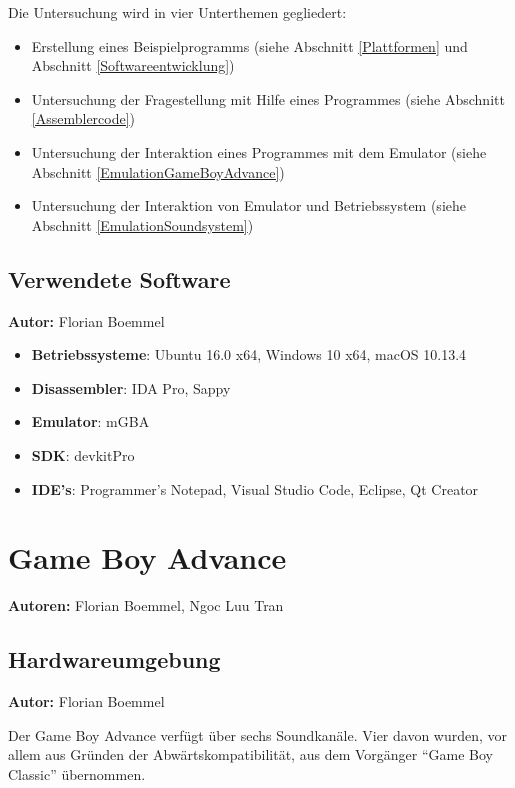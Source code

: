\documentclass[11pt,a4paper]{scrartcl}
\newcommand{\AutorFlorian} {
    \vspace{-4mm}
    \large \textbf{Autor:} Florian Boemmel \normalsize
    \vspace{2mm}
}
\newcommand{\AutorFlorianNgoc} {
    \vspace{-4mm}
    \large \textbf{Autoren:} Florian Boemmel, Ngoc Luu Tran \normalsize
    \vspace{2mm}
}
\begin{document}
Die Untersuchung wird in vier Unterthemen gegliedert:

\begin{itemize}
    \item Erstellung eines Beispielprogramms (siehe Abschnitt \ref{Plattformen} und Abschnitt \ref{Softwareentwicklung})
    \item Untersuchung der Fragestellung mit Hilfe eines Programmes (siehe Abschnitt \ref{Assemblercode})
    \item Untersuchung der Interaktion eines Programmes mit dem Emulator (siehe Abschnitt \ref{EmulationGameBoyAdvance})
    \item Untersuchung der Interaktion von Emulator und Betriebssystem (siehe Abschnitt \ref{EmulationSoundsystem})
\end{itemize}

\subsection{Verwendete Software}
\AutorFlorian

\begin{itemize}
    \item \textbf{Betriebssysteme}: Ubuntu 16.0 x64, Windows 10 x64, macOS 10.13.4
    \item \textbf{Disassembler}: IDA Pro, Sappy
    \item \textbf{Emulator}: mGBA
    \item \textbf{SDK}: devkitPro
    \item \textbf{IDE's}: Programmer's Notepad, Visual Studio Code, Eclipse, Qt Creator
\end{itemize}

\newpage


\section{Game Boy Advance} \label{GameBoyAdvance}
\AutorFlorianNgoc

\subsection{Hardwareumgebung} \label{Hardwareumgebung}
\AutorFlorian

Der Game Boy Advance verf\"ugt \"uber sechs Soundkan\"ale. Vier davon wurden, vor allem aus Gr\"unden der Abw\"artskompatibilit\"at, aus dem Vorg\"anger \enquote{Game Boy Classic} \"ubernommen.
\end{document}
